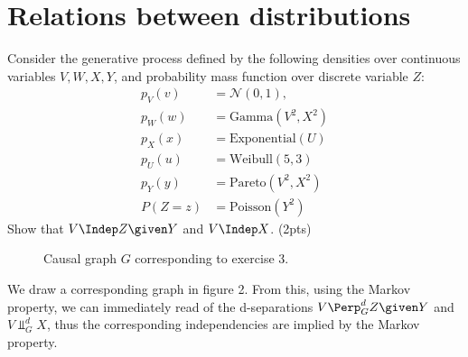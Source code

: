 \section{Relations between distributions}
Consider the generative process defined by the following densities over continuous variables $V, W, X, Y$, and probability mass function over discrete variable $Z$:
\begin{align*}
  p_V(v) &= \mathcal{N}(0,1), \\
  p_W(w) &= \text{Gamma}(V^2, X^2) \\
  p_X(x) &= \text{Exponential}(U) \\
  p_U(u) &= \text{Weibull}(5,3)\\
  p_Y(y) &= \text{Pareto}(V^2, X^2) \\
  P(Z=z) &= \text{Poisson}(Y^2)
\end{align*}
Show that $V \Indep Z \given Y$ and $V \Indep X$. (2pts)

\begin{gradedsolution}
  \begin{figure}[ht]
    \centering
\caption{Causal graph $G$ corresponding to exercise 3.}
\label{fig:three}
\end{figure}
We draw a corresponding graph in figure 2. From this, using the Markov property, we can immediately read of the d-separations $V \Perp^d_G Z \given Y$ and $V \Perp^d_G X$, thus the corresponding independencies are implied by the Markov property.


\end{gradedsolution}

